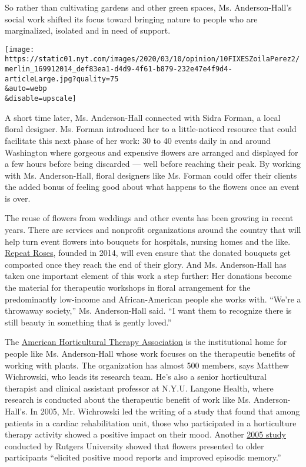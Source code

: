 So rather than cultivating gardens and other green spaces, Ms.
Anderson-Hall's social work shifted its focus toward bringing nature to
people who are marginalized, isolated and in need of support.

\texttt{[image: https://static01.nyt.com/images/2020/03/10/opinion/10FIXESZoilaPerez2/merlin\_169912014\_def83ea1-d4d9-4f61-b879-232e47e4f9d4-articleLarge.jpg?quality=75\\\&auto=webp\\\&disable=upscale]}

A short time later, Ms. Anderson-Hall connected with Sidra Forman, a
local floral designer. Ms. Forman introduced her to a little-noticed
resource that could facilitate this next phase of her work: 30 to 40
events daily in and around Washington where gorgeous and expensive
flowers are arranged and displayed for a few hours before being
discarded --- well before reaching their peak. By working with Ms.
Anderson-Hall, floral designers like Ms. Forman could offer their
clients the added bonus of feeling good about what happens to the
flowers once an event is over.

The reuse of flowers from weddings and other events has been growing in
recent years. There are services and nonprofit organizations around the
country that will help turn event flowers into bouquets for hospitals,
nursing homes and the like. \href{https://repeatroses.com/}{Repeat
Roses}, founded in 2014, will even ensure that the donated bouquets get
composted once they reach the end of their glory. And Ms. Anderson-Hall
has taken one important element of this work a step further: Her
donations become the material for therapeutic workshops in floral
arrangement for the predominantly low-income and African-American people
she works with. ``We're a throwaway society,'' Ms. Anderson-Hall said.
``I want them to recognize there is still beauty in something that is
gently loved.''

The \href{https://www.ahta.org/}{American Horticultural Therapy
Association} is the institutional home for people like Ms. Anderson-Hall
whose work focuses on the therapeutic benefits of working with plants.
The organization has almost 500 members, says Matthew Wichrowski, who
leads its research team. He's also a senior horticultural therapist and
clinical assistant professor at N.Y.U. Langone Health, where research is
conducted about the therapeutic benefit of work like Ms.
Anderson-Hall's. In 2005, Mr. Wichrowski led the writing of a study that
found that among patients in a cardiac rehabilitation unit, those who
participated in a horticulture therapy activity showed a positive impact
on their mood. Another
\href{https://journals.sagepub.com/doi/pdf/10.1177/147470490500300109}{2005
study} conducted by Rutgers University showed that flowers presented to
older participants ``elicited positive mood reports and improved
episodic memory.''

